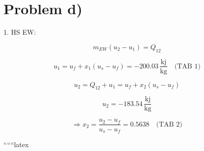 \section*{Problem d)}

1. HS EW:

\[
m_{EW} (u_2 - u_1) = Q_{12}
\]

\[
u_1 = u_f + x_1 (u_s - u_f) = -200.03 \, \frac{\text{kj}}{\text{kg}} \quad \text{(TAB 1)}
\]

\[
u_2 = Q_{12} + u_1 = u_f + x_2 (u_s - u_f)
\]

\[
u_2 = -183.54 \, \frac{\text{kj}}{\text{kg}}
\]

\[
\Rightarrow x_2 = \frac{u_2 - u_f}{u_s - u_f} = 0.5638 \quad \text{(TAB 2)}
\]

``````latex